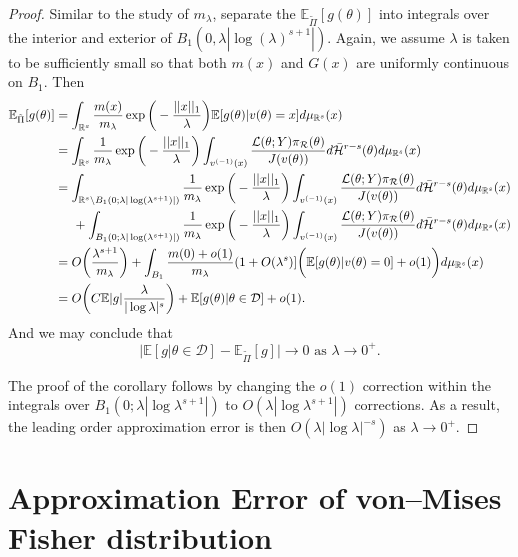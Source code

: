 \documentclass[10pt,fleqn]{article}
\newcommand{\bb}[1]{\mathbb{#1}} \newcommand{\mc}[1]{\mathcal{#1}}
\DeclareMathOperator{\1}{\mathbbm{1}} \DeclareMathOperator{\bigO}{\mc O}
\begin{document}
\begin{proof}
Similar to the study of $m_\lambda$, separate the $\bb E_{\tilde{\Pi}}[g(\theta)]$ into integrals over the interior and exterior of $B_1(0,\lambda|\log(\lambda)^{s+1}|)$. Again, we assume $\lambda$ is taken to be sufficiently small so that both $m(x)$ and $G(x)$ are uniformly continuous on $B_1$. Then 
\begin{align*}
\bb E_{\tilde{\Pi}}[g(\theta)] &= \int_{\mathbb{R}^s} \frac{m(x)}{m_\lambda}\exp\bigg(-\frac{||x||_1}{\lambda}\bigg)\bb E[g(\theta)|v(\theta)=x]d\mu_{\mathbb{R}^s}(x) \\
&= \int_{\mathbb{R}^s} \frac{1}{m_\lambda}\exp\bigg(-\frac{||x||_1}{\lambda}\bigg)\int_{v^{(-1)}(x)} \frac{\mathcal{L}(\theta;Y)\pi_\mathcal{R}(\theta)}{J(v(\theta))}d\bar{\mathcal{H}}^{r-s}(\theta) d\mu_{\mathbb{R}^s}(x) \\
&=\int_{\mathbb{R}^s \setminus B_1(0;\lambda|\log(\lambda^{s+1})|)} \frac{1}{m_\lambda}\exp\bigg(-\frac{||x||_1}{\lambda}\bigg) \int_{v^{(-1)}(x)} \frac{\mathcal{L}(\theta;Y)\pi_\mathcal{R}(\theta)}{J(v(\theta))}d\bar{\mathcal{H}}^{r-s}(\theta) d\mu_{\mathbb{R}^s}(x) \\
&\hspace{0.5 cm} + \int_{B_1(0;\lambda|\log(\lambda^{s+1})|)} \frac{1}{m_\lambda}\exp\bigg(-\frac{||x||_1}{\lambda}\bigg) \int_{v^{(-1)}(x)} \frac{\mathcal{L}(\theta;Y)\pi_\mathcal{R}(\theta)}{J(v(\theta))}d\bar{\mathcal{H}}^{r-s}(\theta)  d\mu_{\mathbb{R}^s}(x) \\
&= O\bigg( \frac{\lambda^{s+1}}{m_\lambda} \bigg) + \int_{B_1} \frac{m(0)+o(1)}{m_\lambda}(1+O(\lambda^s)]\bigg(\bb E[g(\theta)|v(\theta)=0] + o(1) \bigg) d\mu_{\mathbb{R}^s}(x)  \\
&= O\bigg( C \bb E|g|\frac{\lambda}{|\log\lambda|^s}\bigg) + \bb E[g(\theta)|\theta \in \mathcal{D}] + o(1).
\end{align*}
And we may conclude that $$\bigg|\bb E[g|\theta\in\mathcal{D}] - \bb E_{\tilde{\Pi}}[g] \bigg| \to 0 \text{ as } \lambda\to0^+.$$

The proof of the corollary follows by changing the $o(1)$ correction within the integrals over $B_1(0;\lambda|\log \lambda^{s+1}|)$ to $O(\lambda |\log \lambda^{s+1}|)$ corrections.  As a result, the leading order approximation error is then $O(\lambda|\log \lambda|^{-s})$ as $\lambda\to 0^+.$
\end{proof}


\section{Approximation Error of von--Mises Fisher distribution}
\end{document}
